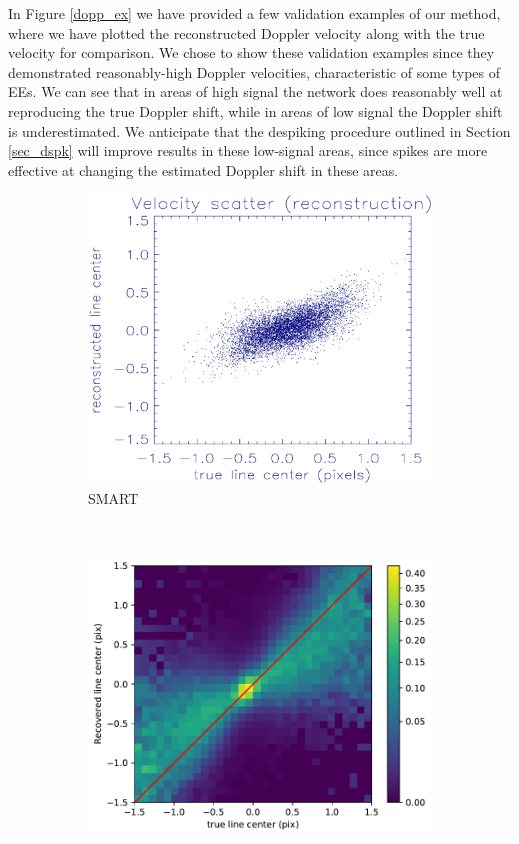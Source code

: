 \documentclass[10pt,letterpaper, doublespace]{article}
\newcommand{\EEs}{\acp{EE}}
\begin{document}
			In Figure \ref{dopp_ex} we have provided a few validation examples of our method, where we have plotted the reconstructed Doppler velocity along with the true velocity for comparison. 
			We chose to show these validation examples since they demonstrated reasonably-high Doppler velocities, characteristic of some types of \EEs.
			We can see that in areas of high signal the network does reasonably well at reproducing the true Doppler shift, while in areas of low signal the Doppler shift is underestimated.
			We anticipate that the despiking procedure outlined in Section \ref{sec_dspk} will improve results in these low-signal areas, since spikes are more effective at changing the estimated Doppler shift in these areas.
			
			\begin{figure}[t!]
				\centering
				\begin{subfigure}[t]{0.5\textwidth}
					\centering
					\includegraphics[width=\textwidth]{fig/smart_hist}
					\caption{SMART}
					\label{smart_hist}
				\end{subfigure}%
				~ 
				\begin{subfigure}[t]{0.5\textwidth}
					\centering	
					\includegraphics[width=\textwidth]{fig/linearity}

\end{subfigure}
\end{figure}
\end{document}
